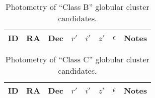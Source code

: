 \documentclass[useAMS,usenatbib]{mn2e}
\begin{document}
\begin{table*}
 \centering
  \caption{Photometry of ``Class B'' globular cluster candidates.}
\label{tab:class_b}  
\begin{tabular}{@{}lllccccl@{}}
  \hline
ID & RA & Dec &$r'$& $i'$& $z'$& $\epsilon$& Notes\\
 \hline

\hline
\end{tabular}
\end{table*}

\begin{table*}
 \centering
  \caption{Photometry of ``Class C'' globular cluster candidates.}
\label{tab:class_c}  
\begin{tabular}{@{}lllccccl@{}}
  \hline
ID & RA & Dec &$r'$& $i'$& $z'$& $\epsilon$& Notes\\
 \hline

\hline
\end{tabular}
\end{table*}

\bsp
\label{lastpage}
\end{document}
